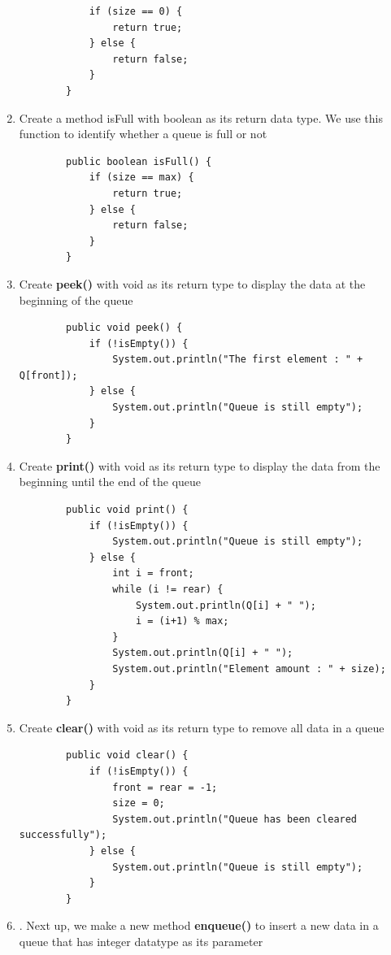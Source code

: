 \documentclass[12pt,titlepage]{article}
\begin{document}
\begin{enumerate}
\begin{verbatim}
            if (size == 0) {
                return true;
            } else {
                return false;
            }
        }
    \end{verbatim}
    \item Create a method isFull with boolean as its return data type. We use this function to identify whether a queue is full or not
    \begin{verbatim}
        public boolean isFull() {
            if (size == max) {
                return true;
            } else {
                return false;
            }
        }
    \end{verbatim}
    \item Create \textbf{peek()} with void as its return type to display the data at the beginning of the queue
    \begin{verbatim}
        public void peek() {
            if (!isEmpty()) {
                System.out.println("The first element : " + Q[front]);
            } else {
                System.out.println("Queue is still empty");
            }
        }
    \end{verbatim}
    \item Create \textbf{print()} with void as its return type to display the data from the beginning until the end of the queue
    \begin{verbatim}
        public void print() {
            if (!isEmpty()) {
                System.out.println("Queue is still empty");
            } else {
                int i = front;
                while (i != rear) {
                    System.out.println(Q[i] + " ");
                    i = (i+1) % max;
                }
                System.out.println(Q[i] + " ");
                System.out.println("Element amount : " + size);
            }
        }
    \end{verbatim}
    \item Create \textbf{clear()} with void as its return type to remove all data in a queue
    \begin{verbatim}
        public void clear() {
            if (!isEmpty()) {
                front = rear = -1;
                size = 0;
                System.out.println("Queue has been cleared successfully");
            } else {
                System.out.println("Queue is still empty");
            }
        }
    \end{verbatim}
    \item. Next up, we make a new method \textbf{enqueue()} to insert a new data in a queue that has integer datatype as its parameter

\end{enumerate}
\end{document}

